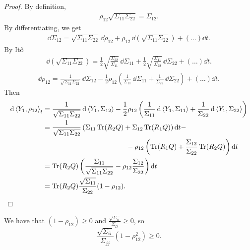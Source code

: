\begin{proof}
    By definition,
    \begin{align*}
        \rho_{12}\sqrt{\Sigma_{11}\Sigma_{22}} = \Sigma_{12}.
    \end{align*}
    By differentiating, we get
    \begin{align*}
        \dd\Sigma_{12} = \sqrt{\Sigma_{11}\Sigma_{22}}\,\dd \rho_{12} + \rho_{12}\,\dd(\sqrt{\Sigma_{11}\Sigma_{22}}) + (\dots)\dd t.
    \end{align*}
    By Itô
    \begin{align*}
        \dd(\sqrt{\Sigma_{11}\Sigma_{22}}) = \frac{1}{2}\sqrt{\frac{\Sigma_{22}}{\Sigma_{11}}}\,\dd\Sigma_{11} + \frac{1}{2}\sqrt{\frac{\Sigma_{11}}{\Sigma_{22}}}\,\dd\Sigma_{22} + (\dots)\dd t.
    \end{align*}
    \begin{align*}
          \dd\rho_{12} = \frac{1}{\sqrt{\Sigma_{11}\Sigma_{22}}}\,\dd \Sigma_{12} - \frac{1}{2}\rho_{12}\left(
          \frac{1}{\Sigma_{11}}\,\dd\Sigma_{11} +
          \frac{1}{\Sigma_{22}}\,\dd\Sigma_{22}\right) + (\dots)\dd t.
    \end{align*}
    Then
    \begin{align*}
        \dd\expval{Y_1,\rho_{12}}_t &= \frac{1}{\sqrt{\Sigma_{11}\Sigma_{22}}}\,\dd\expval{Y_1,\Sigma_{12}} - \frac{1}{2}\rho_{12} \left(
        \frac{1}{\Sigma_{11}}\,\dd\expval{Y_1,\Sigma_{11}} + \frac{1}{\Sigma_{22}}\,\dd\expval{Y_1,\Sigma_{22}}
        \right) \\
        &=
        \frac{1}{\sqrt{\Sigma_{11}\Sigma_{22}}}\left(\Sigma_{11}\Tr(R_2Q)+\Sigma_{12}\Tr(R_1Q)\right)\dd t - \\
        &\qquad\qquad\qquad\qquad\qquad\qquad - \rho_{12}\left(\Tr(R_1Q) + \frac{\Sigma_{12}}{\Sigma_{22}}\Tr(R_2Q)\right)\dd t \\
        &=
        \Tr(R_2Q)\left(\frac{\Sigma_{11}}{\sqrt{\Sigma_{11}\Sigma_{22}}}-\rho_{12}\frac{\Sigma_{12}}{\Sigma_{22}}\right)\dd t \\
        &=
        \Tr(R_2Q)\frac{\sqrt{\Sigma_{11}}}{\Sigma_{22}}(1-\rho_{12}). %
    \end{align*}
\end{proof}
We have that $(1-\rho_{12})\ge0$ and $\tfrac{\sqrt{\Sigma_{ii}}}{\Sigma_{jj}}\ge0$, so
\begin{equation*}
    \frac{\sqrt{\Sigma_{ii}}}{\Sigma_{jj}}(1-\rho_{12}^2) \ge 0.
\end{equation*}
